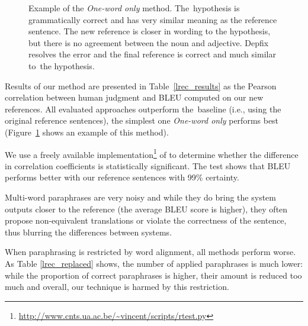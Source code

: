 \documentclass[11pt]{article}
\def\Tref#1{Table~\ref{#1}}
\def\Fref#1{Figure~\ref{#1}}
\def\footurl#1{\footnote{\url{#1}}}
\begin{document}
\begin{figure}[t]
\begin{center}
{\begin{tabular}{ll}
\end{tabular}}
\caption{Example of the \textit{One-word only} method. The~hypothesis is grammatically 
correct and has very similar meaning as the reference sentence. The new reference is closer 
in wording to the hypothesis, but there is no agreement between the noun and adjective. 
Depfix resolves the error and the final reference is correct and much similar to~the hypothesis.}
\label{lrec_example}
\end{center}
\end{figure}

Results of our method are presented in \Tref{lrec_results} as the Pearson 
correlation between human judgment and BLEU computed on our new references. 
All evaluated approaches outperform the~baseline (i.e., using the original 
reference sentences), the simplest one \textit{One-word only} performs 
best (\Fref{lrec_example} shows an example of this method).

 
We use a freely available implementation\footurl{http://www.cnts.ua.ac.be/~vincent/scripts/rtest.py} of \cite{meng:1992} to determine whether the difference in correlation
coefficients is statistically significant. The test shows that BLEU performs
better with our reference sentences with 99\% certainty. 

Multi-word paraphrases are very noisy and while they do bring the system 
outputs closer to the reference (the average BLEU score is higher), they 
often propose non-equivalent translations or violate the correctness of the 
sentence, thus blurring the differences between systems.

When paraphrasing is restricted by word alignment, all methods perform worse. 
As Table \ref{lrec_replaced} shows, the number of applied paraphrases is much lower: 
while the proportion of correct paraphrases is higher, their amount is reduced 
too much and overall, our technique is harmed by this restriction. 
\end{document}
